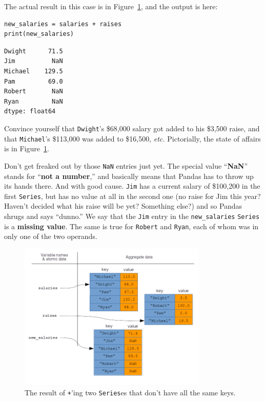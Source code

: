 The actual result in this case is in Figure~\ref{fig:vectorizedPandas2}, and
the output is here:


\begin{Verbatim}[fontsize=\small,samepage=true,frame=single,framesep=3mm]
new_salaries = salaries + raises
print(new_salaries)
\end{Verbatim}

\begin{Verbatim}[fontsize=\small,samepage=true,frame=leftline,framesep=5mm,framerule=1mm]
Dwight      71.5
Jim          NaN
Michael    129.5
Pam         69.0
Robert       NaN
Ryan         NaN
dtype: float64
\end{Verbatim}


Convince yourself that \texttt{Dwight}'s \$68,000 salary got added to his
\$3,500 raise, and that \texttt{Michael}'s \$113,000 was added to \$16,500,
\textit{etc.} Pictorially, the state of affairs is in
Figure~\ref{fig:vectorizedPandas2}.

Don't get freaked out by those \texttt{NaN} entries just yet. The special value
``\textbf{NaN}'' stands for ``\textbf{not a number},'' and basically means that
Pandas has to throw up its hands there. And with good cause. \texttt{Jim} has a
current salary of \$100,200 in the first \texttt{Series}, but has no value at
all in the second one (no raise for Jim this year? Haven't decided what his
raise will be yet? Something else?) and so Pandas shrugs and says ``dunno.'' We
say that the \texttt{Jim} entry in the \texttt{new\_salaries} \texttt{Series}
is a \textbf{missing value}. The same is true for \texttt{Robert} and
\texttt{Ryan}, each of whom was in only one of the two operands.

\begin{figure}[ht]
\centering
\includegraphics[width=0.8\textwidth]{vectorizedPandas2.png}
\caption{The result of \texttt{+}'ing two \texttt{Series}es that don't have all the same keys.}
\label{fig:vectorizedPandas2}
\end{figure}

